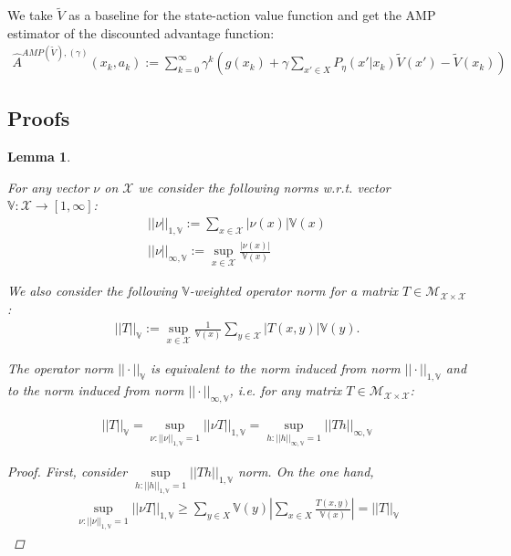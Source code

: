 \documentclass[11pt]{article}
\newcommand{\X}{\mathcal{X}}
\newcommand{\M}{\mathcal{M}}
\newcommand{\V}{\mathbb{V}}
\newtheorem{lemma}{Lemma}
\theoremstyle{definition}
\numberwithin{equation}{section}
\begin{document}
We take $\tilde V$ as a baseline for the state-action value function and  get the AMP  estimator of the discounted advantage function:  
\begin{align*} 
\hat A^{AMP(\tilde V), (\gamma)} (x_k, a_k) :=  \sum\limits_{k=0}^\infty\gamma^k \left(g(x_k ) +  \gamma \sum\limits_{x'\in X} P_{\eta}(x'|x_k)  \tilde V(x')   -   \tilde V(x_k )  \right)  
\end{align*}


\subsection{Proofs}\label{sec:proofs}

 \begin{lemma}\label{lem:norms}

For any vector $\nu$ on $\X$ we consider the following norms w.r.t.  vector $\V:\X\rightarrow [1, \infty]$:
\begin{align*}
||\nu||_{1, \V}:=\sum\limits_{x\in \X} |\nu(x)|\V(x)\\
||\nu||_{\infty, \V} := \sup\limits_{x\in \X} \frac{|\nu(x)|}{\V(x)} 
\end{align*}

We also consider the following $\V$-weighted operator norm for a matrix $T\in \M_{\X\times \X}$:
\begin{align*}
||T||_\V:=\sup\limits_{x\in \X} \frac{1}{\V(x)} \sum\limits_{y\in \X} |T(x, y)|\V(y).
\end{align*}

The operator norm $||\cdot||_\V$ is equivalent to the norm  induced from norm $||\cdot||_{1, \V}$ and  to the norm induced from norm $||\cdot||_{\infty, \V}$, i.e. for any matrix  $T\in \M_{\X\times \X}$:

\begin{align*}
||T||_\V = \sup\limits_{\nu:||\nu||_{1, \V}=1} ||\nu T ||_{1, \V} = \sup\limits_{h:||h||_{\infty,\V} = 1} || Th ||_{\infty, \V}
\end{align*}


\begin{proof}

First, consider $\sup\limits_{h:||h||_{1, \V} = 1} || Th ||_{1, \V}$ norm. On the one hand, 
\begin{align*}
 \sup\limits_{\nu:||\nu||_{1, \V}=1} ||\nu T ||_{1, \V} \geq \sum\limits_{y\in X} \V(y) \left| \sum\limits_{x\in X} \frac{T(x, y)}{\V(x)}   \right| = ||T||_\V
\end{align*}


\end{proof}
\end{lemma}
\end{document}
